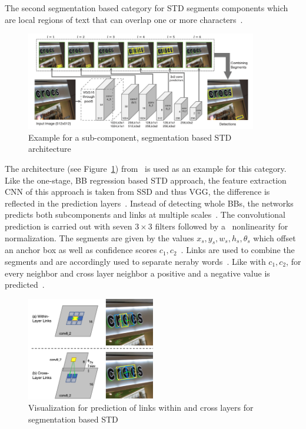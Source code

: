 The second segmentation based category for \ac{STD} segments components which are local regions of
text that can overlap one or more characters~\citep{long_scene_2021}.
\begin{figure}[ht]
    \centering
    \includegraphics[width=0.9\textwidth]{img/STD-seg-based-architecture-Shi-Detecting-2017.png}
    \caption[Sub-component, segmentation based STD architecture]{%
        Example for a sub-component, segmentation based STD
        architecture~\citep{shi_detecting_2017}\label{fig:STD-segbased-component-architecture}
    }
\end{figure}
The architecture (see Figure~\ref{fig:STD-segbased-component-architecture})
from~\cite{shi_detecting_2017} is used as an example for this category.
Like the one-stage, \ac{BB} regression based \ac{STD} approach, the feature extraction \ac{CNN} of
this approach is taken from SSD and thus VGG, the difference is reflected in the prediction
layers~\citep{shi_detecting_2017,liu_ssd_2016,simonyan_very_2015}.
Instead of detecting whole \acp{BB}, the networks predicts both subcomponents and links at multiple
scales~\citep{shi_detecting_2017}.
The convolutional prediction is carried out with seven $3\times3$ filters followed by a \sfmx\
nonlinearity for normalization.
The segments are given by the values $x_s,y_s,w_s,h_s,\theta_s$ which offset an anchor box as well
as confidence scores $c_1,c_2$~\citep{shi_detecting_2017}.
Links are used to combine the segments and are accordingly used to separate neraby
words~\citep{shi_detecting_2017}.
Like with $c_1,c_2$, for every neighbor and cross layer neighbor a positive and a negative value
is predicted~\citep{shi_detecting_2017}.
\begin{figure}[ht]
    \centering
    \includegraphics[width=0.5\textwidth]{img/STD-seg-based-links-Shi-Detecting-2017.png}
    \caption[Predicting links for segmentation based STD]{%
        Visualization for prediction of links within and cross layers for segmentation based
        STD~\citep{shi_detecting_2017}\label{fig:STD-segbased-component-links}
    }
\end{figure}
